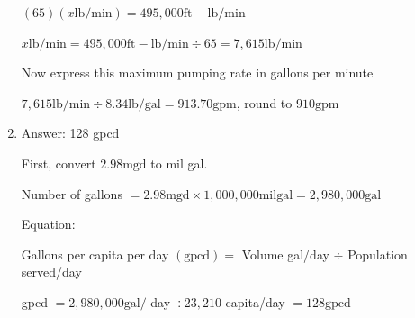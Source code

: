 \documentclass[10pt]{article}
\begin{document}
\begin{enumerate}
$(65)(x \mathrm{lb} / \mathrm{min})=495,000 \mathrm{ft}-\mathrm{lb} / \mathrm{min}$

$x \mathrm{lb} / \mathrm{min}=495,000 \mathrm{ft}-\mathrm{lb} / \mathrm{min} \div 65=7,615 \mathrm{lb} / \mathrm{min}$

Now express this maximum pumping rate in gallons per minute

$7,615 \mathrm{lb} / \mathrm{min} \div 8.34 \mathrm{lb} / \mathrm{gal}=913.70 \mathrm{gpm}$, round to $910 \mathrm{gpm}$

  \item Answer: 128 gpcd

First, convert $2.98 \mathrm{mgd}$ to mil gal.

Number of gallons $=2.98 \mathrm{mgd} \times 1,000,000 \mathrm{mil} \mathrm{gal}=2,980,000 \mathrm{gal}$

Equation:

Gallons per capita per day $(\mathrm{gpcd})=$ Volume gal/day $\div$ Population served/day

gpcd $=2,980,000 \mathrm{gal} /$ day $\div 23,210$ capita/day $=128 \mathrm{gpcd}$
  
  
\end{enumerate}
\end{document}
